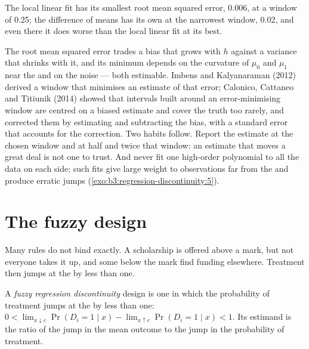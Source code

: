 \label{out:b3:regression-discontinuity:bandwidth}

The local linear fit has its smallest root mean squared error, 0.006, at a
window of 0.25; the difference of means has its own at the narrowest window,
0.02, and even there it does worse than the local linear fit at its best.

\begin{measure}
The root mean squared error trades a bias that grows with $h$ against a variance
that shrinks with it, and its minimum depends on the curvature of $\mu_0$ and
$\mu_1$ near the  and on the noise --- both estimable. Imbens and
Kalyanaraman (2012) derived a window that minimises an estimate of that error;
Calonico, Cattaneo and Titiunik (2014) showed that intervals built around an
error-minimising window are centred on a biased estimate and cover the truth
too rarely, and corrected them by estimating and subtracting the bias, with a
standard error that accounts for the correction. Two habits follow. Report the
estimate at the chosen window and at half and twice that window: an estimate
that moves a great deal is not one to trust. And never fit one high-order
polynomial to all the data on each side; such fits give large weight to
observations far from the  and produce erratic jumps
(\cref{exo:b3:regression-discontinuity:5}).
\end{measure}

\section{The fuzzy design}\label{sec:b3:regression-discontinuity:fuzzy}

Many rules do not bind exactly. A scholarship is offered above a mark, but not
everyone takes it up, and some below the mark find funding elsewhere. Treatment
then jumps at the  by less than one.

\begin{definition}\label{def:b3:regression-discontinuity:fuzzy}
A \emph{fuzzy regression discontinuity} design is one in which the probability of
treatment jumps at the  by less than one: $0 < \lim_{x \downarrow c}
\Pr(D_i = 1 \mid x) - \lim_{x \uparrow c} \Pr(D_i = 1 \mid x) < 1$. Its estimand
is the ratio of the jump in the mean outcome to the jump in the probability of
treatment.
\end{definition}

